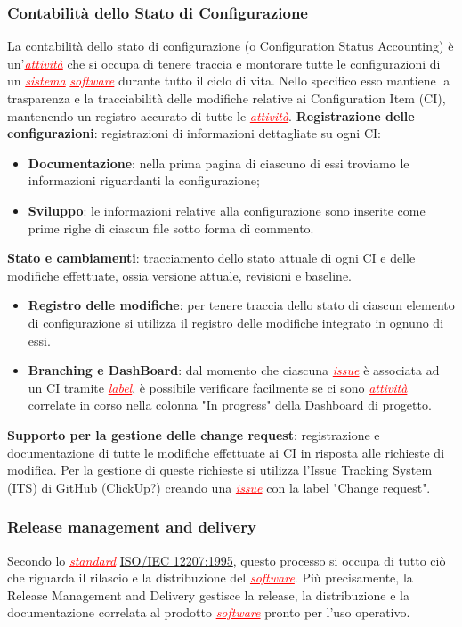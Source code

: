 \subsubsection{Contabilità dello Stato di Configurazione}
La contabilità dello stato di configurazione (o Configuration Status Accounting) è un'\textcolor{red}{\uline{\textit{attività}}} 
che si occupa di tenere traccia e montorare tutte le configurazioni di un \textcolor{red}{\uline{\textit{sistema}}} \textcolor{red}{\uline{\textit{software}}}
durante tutto il ciclo di vita. Nello specifico esso mantiene la trasparenza e la tracciabilità delle modifiche relative ai Configuration Item (CI),
mantenendo un registro accurato di tutte le \textcolor{red}{\uline{\textit{attività}}}.
\textbf{Registrazione delle configurazioni}: registrazioni di informazioni dettagliate su ogni CI:
\begin{itemize}
    \item \textbf{Documentazione}: nella prima pagina di ciascuno di essi troviamo le informazioni riguardanti la configurazione;
    \item \textbf{Sviluppo}: le informazioni relative alla configurazione sono inserite come prime
    righe di ciascun file sotto forma di commento.
\end{itemize}
\textbf{Stato e cambiamenti}: tracciamento dello stato attuale di ogni CI e delle modifiche effettuate, ossia versione attuale, revisioni e baseline.
\begin{itemize}
    \item \textbf{Registro delle modifiche}: per tenere traccia dello stato di ciascun elemento di configurazione si utilizza il registro
    delle modifiche integrato in ognuno di essi.
    \item \textbf{Branching e DashBoard}: dal momento che ciascuna \textcolor{red}{\uline{\textit{issue}}} è associata ad un CI tramite
    \textcolor{red}{\uline{\textit{label}}}, è possibile verificare facilmente se ci sono \textcolor{red}{\uline{\textit{attività}}} correlate
    in corso nella colonna "In progress" della Dashboard di progetto.
\end{itemize}
\textbf{Supporto per la gestione delle change request}: registrazione e documentazione di tutte le modifiche effettuate ai CI in risposta alle
richieste di modifica. Per la gestione di queste richieste si utilizza l'Issue Tracking System (ITS) di GitHub (ClickUp?) creando una
\textcolor{red}{\uline{\textit{issue}}} con la label "Change request".

\subsubsection{Release management and delivery}
Secondo lo \textcolor{red}{\uline{\textit{standard}}} \href{https://www.math.unipd.it/~tullio/IS-1/2009/Approfondimenti/ISO_12207-1995.pdf}{ISO/IEC 12207:1995},
questo processo si occupa di tutto ciò che riguarda il rilascio e la distribuzione del \textcolor{red}{\uline{\textit{software}}}. Più precisamente,
la Release Management and Delivery gestisce la release, la distribuzione e la documentazione correlata al prodotto \textcolor{red}{\uline{\textit{software}}}
pronto per l'uso operativo.

